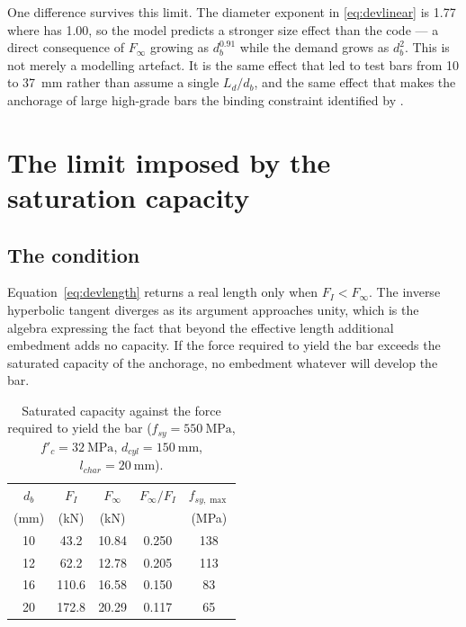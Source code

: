 One difference survives this limit. The diameter exponent in
\eqref{eq:devlinear} is \num{1.77} where
\textcite{as3600ConcreteStructures2018} has \num{1.00}, so the model
predicts a stronger size effect than the code --- a direct consequence of
$F_\infty$ growing as $d_b^{0.91}$ while the demand grows as $d_b^2$. This
is not merely a modelling artefact. It is the same effect that led
\textcite{fosterDevelopmentLapLengths} to test bars from \SI{10}{} to
\SI{37}{\milli\metre} rather than assume a single $L_d/d_b$, and the same
effect that makes the anchorage of large high-grade bars the binding
constraint identified by \textcite{ngChangesAustralianStandards}.


\section{The limit imposed by the saturation capacity}
\label{sec:devlimit}

\subsection{The condition}

Equation~\eqref{eq:devlength} returns a real length only when
$F_I < F_\infty$. The inverse hyperbolic tangent diverges as its argument
approaches unity, which is the algebra expressing the fact that beyond the
effective length additional embedment adds no capacity. If the force
required to yield the bar exceeds the saturated capacity of the anchorage,
no embedment whatever will develop the bar.

\begin{table}[H]
\centering
\caption{Saturated capacity against the force required to yield the bar
         ($f_{sy} = \SI{550}{\mega\pascal}$,
          $f'_c = \SI{32}{\mega\pascal}$,
          $d_{cyl} = \SI{150}{\milli\metre}$,
          $l_{char} = \SI{20}{\milli\metre}$).}
\label{tab:devcheck}
\small
\begin{tabular*}{\linewidth}{@{\extracolsep{\fill}}ccccc@{}}
\hline
$d_b$ & $F_I$ & $F_\infty$ & $F_\infty/F_I$ & $f_{sy,\max}$ \\
(mm)  & (kN)  & (kN)       &                & (MPa) \\
\hline
10 & 43.2  & 10.84 & 0.250 & 138 \\
12 & 62.2  & 12.78 & 0.205 & 113 \\
16 & 110.6 & 16.58 & 0.150 & 83  \\
20 & 172.8 & 20.29 & 0.117 & 65  \\
\hline
\end{tabular*}
\end{table}

